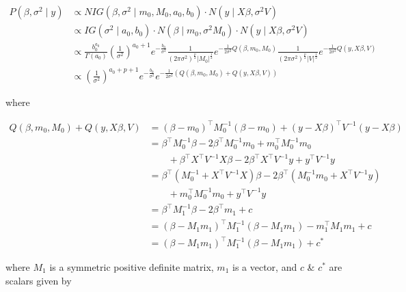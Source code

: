 \documentclass[
]{book}
\theoremstyle{definition}
\theoremstyle{definition}
\theoremstyle{definition}
\theoremstyle{definition}
\theoremstyle{remark}
\begin{document}
\begin{align}\label{eq:post_dist}
P\left(\beta, \sigma^{2} \mid y\right) & \propto NIG\left(\beta, \sigma^{2} \mid m_{0}, M_{0}, a_{0}, b_{0}\right) \cdot N\left(y \mid X \beta, \sigma^{2} V\right) \nonumber\\
& \propto IG\left(\sigma^{2} \mid a_{0}, b_{0}\right) \cdot N\left(\beta \mid m_{0}, \sigma^{2} M_{0}\right) \cdot N\left(y \mid X \beta, \sigma^{2} V\right) \nonumber\\
& \propto \frac{b_0^{a_0}}{\Gamma\left(a_{0}\right)}
\left(\frac{1}{\sigma^{2}}\right)^{a_{0}+1} e^{-\frac{b_{0}}{\sigma^{2}}} 
\frac{1}{(2 \pi \sigma^{2})^{\frac{p}{2}}\left| M_{0}\right|^{\frac{1}{2}}} e^{-\frac{1}{2 \sigma^{2}} Q \left(\beta, m_{0}, M_{0}\right)} 
\frac{1}{(2 \pi \sigma^{2})^{\frac{p}{2}}\left| V\right|^{\frac{1}{2}}} e^{-\frac{1}{2 \sigma^{2}} Q \left(y, X \beta, V\right)} \nonumber\\
& \propto \left(\frac{1}{\sigma^{2}}\right)^{a_{0}+p+1} e^{-\frac{b_{0}}{\sigma^{2}}} 
e^{-\frac{1}{2 \sigma^{2}} (Q \left(\beta, m_{0}, M_{0}\right)+Q \left(y, X \beta, V\right))}\;
\end{align}

where

\begin{align}\label{eq:multivariate_completion_square}
Q \left(\beta, m_{0}, M_{0}\right)+Q \left(y, X \beta, V\right) &= (\beta - m_{0})^{\top}M_{0}^{-1}(\beta - m_{0}) + (y - X\beta)^{\top}V^{-1}(y - X\beta)\; \nonumber\\
 &= \beta^{\top}M_{0}^{-1}\beta - 2\beta^{\top}M_{0}^{-1}m_{0} + m_{0}^{\top}M_{0}^{-1}m_{0} \nonumber\\
  &\qquad + \beta^{\top}X^{\top}V^{-1}X\beta - 2\beta^{\top} X^{\top}V^{-1}y + y^{\top}V^{-1}y \nonumber\\
  &= \beta^{\top} \left(M_{0}^{-1} + X^{\top}V^{-1}X\right) \beta - 2\beta^{\top}\left(M_{0}^{-1}m_{0} + X^{\top}V^{-1}y\right) \nonumber\\
  &\qquad + m_{0}^{\top} M_{0}^{-1}m_{0} + y^{\top}V^{-1}y \nonumber \\
  &= \beta^{\top}M_{1}^{-1}\beta - 2\beta^{\top} m_{1} + c\nonumber\\
  &= (\beta - M_{1}m_{1})^{\top}M_{1}^{-1}(\beta - M_{1}m_{1}) - m_{1}^{\top}M_{1}m_{1} +c \nonumber\\   
  &= (\beta - M_{1}m_{1})^{\top}M_{1}^{-1}(\beta - M_{1}m_{1}) +c^{\ast}\;
\end{align}

where \(M_{1}\) is a symmetric positive definite matrix, \(m_{1}\) is a vector, and \(c\) \& \(c^{\ast}\) are scalars given by
\end{document}
